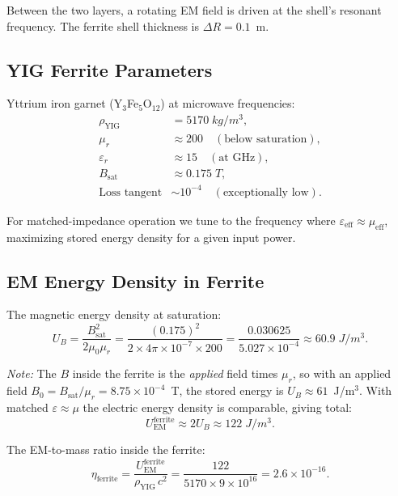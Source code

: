 \documentclass[amsmath,amssymb,aps,prd,superscriptaddress,nofootinbib]{revtex4-2}
\begin{document}
Between the two layers, a rotating EM field is driven at the shell's
resonant frequency. The ferrite shell thickness is $\Delta R = 0.1$~m.

\subsection{YIG Ferrite Parameters}

Yttrium iron garnet (Y$_3$Fe$_5$O$_{12}$) at microwave frequencies:
\begin{align}
\rho_\text{YIG} &= 5170 \; \si{kg/m^3}, \\
\mu_r &\approx 200 \quad (\text{below saturation}), \\
\varepsilon_r &\approx 15 \quad (\text{at GHz}), \\
B_\text{sat} &\approx 0.175 \; \si{T}, \\
\text{Loss tangent} &\sim 10^{-4} \quad (\text{exceptionally low}).
\end{align}

For matched-impedance operation we tune to the frequency where
$\varepsilon_\text{eff} \approx \mu_\text{eff}$, maximizing stored energy
density for a given input power.

\subsection{EM Energy Density in Ferrite}

The magnetic energy density at saturation:
\begin{equation}
U_B = \frac{B_\text{sat}^2}{2\mu_0 \mu_r}
    = \frac{(0.175)^2}{2 \times 4\pi \times 10^{-7} \times 200}
    = \frac{0.030625}{5.027 \times 10^{-4}}
    \approx 60.9 \; \si{J/m^3}.
\end{equation}

\noindent\textit{Note:} The $B$ inside the ferrite is the \emph{applied} field
times $\mu_r$, so with an applied field $B_0 = B_\text{sat}/\mu_r =
8.75 \times 10^{-4}$~T, the stored energy is $U_B \approx 61$~J/m$^3$.
With matched $\varepsilon \approx \mu$ the electric energy density is
comparable, giving total:
\begin{equation}
U_\text{EM}^\text{ferrite} \approx 2 U_B \approx 122 \; \si{J/m^3}.
\end{equation}

The EM-to-mass ratio inside the ferrite:
\begin{equation}\label{eq:eta-ferrite}
\eta_\text{ferrite} = \frac{U_\text{EM}^\text{ferrite}}{\rho_\text{YIG} \, c^2}
= \frac{122}{5170 \times 9 \times 10^{16}}
= 2.6 \times 10^{-16}.
\end{equation}
\end{document}
